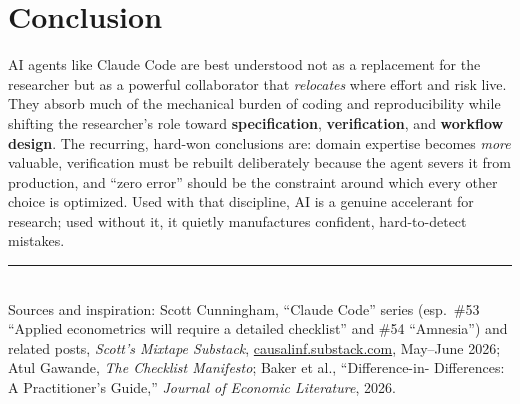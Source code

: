 \documentclass[11pt]{article}
\newcommand{\concept}[1]{\textbf{#1}}
\begin{document}
\section{Conclusion}
AI agents like Claude Code are best understood not as a replacement for the
researcher but as a powerful collaborator that \emph{relocates} where effort and
risk live. They absorb much of the mechanical burden of coding and reproducibility
while shifting the researcher's role toward \concept{specification},
\concept{verification}, and \concept{workflow design}. The recurring, hard-won
conclusions are: domain expertise becomes \emph{more} valuable, verification must
be rebuilt deliberately because the agent severs it from production, and ``zero
error'' should be the constraint around which every other choice is optimized.
Used with that discipline, AI is a genuine accelerant for research; used without
it, it quietly manufactures confident, hard-to-detect mistakes.

\vfill
\noindent\rule{\linewidth}{0.4pt}\\[0.3em]
\footnotesize Sources and inspiration: Scott Cunningham, ``Claude Code'' series
(esp.\ \#53 ``Applied econometrics will require a detailed checklist'' and \#54
``Amnesia'') and related posts, \emph{Scott's Mixtape Substack},
\href{https://causalinf.substack.com}{causalinf.substack.com}, May--June 2026;
Atul Gawande, \emph{The Checklist Manifesto}; Baker et al., ``Difference-in-
Differences: A Practitioner's Guide,'' \emph{Journal of Economic Literature},
2026.
\end{document}
